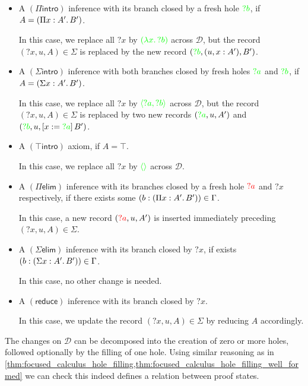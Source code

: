\documentclass[twoside]{report}
\begin{document}
\begin{definition}
\begin{itemize}
    \item A $(\Pi\mathsf{intro})$ inference with its branch closed by a fresh hole $\textcolor{green}{?b}$, if $A = (\Pi{x} : {A'}.\,{B'})$.\par
    In this case, we replace all ${?x}$ by $\textcolor{green}{(\lambda{x}.\,{?b})}$ across $\mathcal D$, but the record $({?x}, u, A) \in \Sigma$ is replaced by the new record $(\textcolor{green}{?b}, (u, x : {A'}), {B'})$.
    
    \item A $(\Sigma\mathsf{intro})$ inference with both branches closed by fresh holes $\textcolor{green}{?a}$ and $\textcolor{green}{?b}$, if $A = (\Sigma{x} : {A'}.\,{B'})$.\par
    In this case, we replace all ${?x}$ by $\textcolor{green}{\langle{?a}, {?b}\rangle}$ across $\mathcal D$, but the record $({?x}, u, A) \in \Sigma$ is replaced by two new records $(\textcolor{green}{?a}, u, {A'})$ and $(\textcolor{green}{?b}, u, [{x}:={\textcolor{green}{?a}}]\,{B'})$.
    
    \item A $(\top\mathsf{intro})$ axiom, if $A = \top$.\par
    In this case, we replace all ${?x}$ by $\textcolor{green}{\langle\rangle}$ across $\mathcal D$.
    
    \item A $(\Pi\mathsf{elim})$ inference with its branches closed by a fresh hole $\textcolor{red}{?a}$ and ${?x}$ respectively, if there exists some $(b : (\Pi{x} : {A'}.\,{B'})) \in \Gamma$.\par
    In this case, a new record $(\textcolor{red}{?a}, u, A')$ is inserted immediately preceding $({?x}, u, A) \in \Sigma$.
    
    \item A $(\Sigma\mathsf{elim})$ inference with its branch closed by ${?x}$, if exists $(b : (\Sigma{x} : {A'}.\,{B'})) \in \Gamma$.\par
    In this case, no other change is needed.
    
    \item A $(\mathsf{reduce})$ inference with its branch closed by ${?x}$.\par
    In this case, we update the record $({?x}, u, A) \in \Sigma$ by reducing $A$ accordingly.
\end{itemize}
The changes on $\mathcal D$ can be decomposed into the creation of zero or more holes, followed optionally by the filling of one hole. Using similar reasoning as in \cref{thm:focused_calculus_hole_filling,thm:focused_calculus_hole_filling_well_formed} we can check this indeed defines a relation between proof states.
\end{definition}
\end{document}
